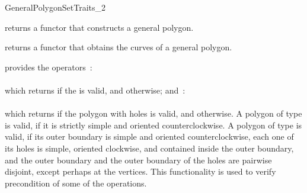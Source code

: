 \begin{ccRefConcept}{GeneralPolygonSetTraits_2}

{returns a functor that constructs a general polygon.}

{returns a functor that obtains the curves of a general polygon.}

{provides the operators~: \\
  \\
 which returns  if the  is valid, and 
 otherwise; and~: \\
  \\
 which returns  if the polygon with holes  
 is valid, and  otherwise.
 A polygon of type  is valid, if it is strictly simple 
 and oriented counterclockwise.
 A polygon of type  is valid, 
 if its outer boundary is simple and oriented counterclockwise, each one of 
 its holes is simple, oriented clockwise, and contained inside the outer 
 boundary, and the outer boundary and the outer boundary of the holes are 
 pairwise disjoint, except perhaps at the vertices. This functionality is 
 used to verify precondition of some of the operations.}

\ccHasModels
\\
\\

\ccSeeAlso

\end{ccRefConcept}

\ccRefPageEnd
